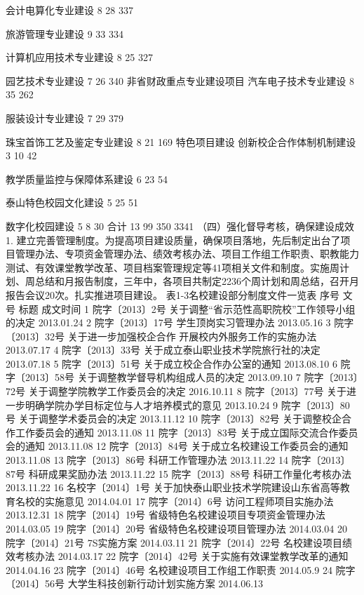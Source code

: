 会计电算化专业建设
8
28
337

旅游管理专业建设
9
33
334

计算机应用技术专业建设
8
25
327

园艺技术专业建设
7
26
340
非省财政重点专业建设项目
汽车电子技术专业建设
8
35
262

服装设计专业建设
7
29
379

珠宝首饰工艺及鉴定专业建设
8
21
169
特色项目建设
创新校企合作体制机制建设
3
10
42

教学质量监控与保障体系建设
6
23
54

泰山特色校园文化建设
5
25
51

数字化校园建设
5
8
30
合计
13
99
350
3341
（四）强化督导考核，确保建设成效
1. 建立完善管理制度。为提高项目建设质量，确保项目落地，先后制定出台了项目管理办法、专项资金管理办法、绩效考核办法、项目工作组工作职责、职教能力测试、有效课堂教学改革、项目档案管理规定等41项相关文件和制度。实施周计划、周总结和月报告制度，三年中，各项目共制定2236个周计划和周总结，召开月报告会议20次。扎实推进项目建设。
表1-3名校建设部分制度文件一览表
序号
文号
标题
成文时间
1
院字〔2013〕2号
关于调整“省示范性高职院校”工作领导小组的决定
2013.01.24
2
院字〔2013〕17号
学生顶岗实习管理办法
2013.05.16
3
院字〔2013〕32号
关于进一步加强校企合作 开展校内外服务工作的实施办法
2013.07.17
4
院字〔2013〕33号
关于成立泰山职业技术学院旅行社的决定
2013.07.18
5
院字〔2013〕51号
关于成立校企合作办公室的通知
2013.08.10
6
院字〔2013〕58号
关于调整教学督导机构组成人员的决定
2013.09.10
7
院字〔2013〕72号
关于调整学院教学工作委员会的决定
2016.10.11
8
院字〔2013〕77号
关于进一步明确学院办学目标定位与人才培养模式的意见
2013.10.24
9
院字〔2013〕80号
关于调整学术委员会的决定
2013.11.12
10
院字〔2013〕82号
关于调整校企合作工作委员会的通知
2013.11.08
11
院字〔2013〕83号
关于成立国际交流合作委员会的通知
2013.11.08
12
院字〔2013〕84号
关于成立名校建设工作委员会的通知
2013.11.08
13
院字〔2013〕86号
科研工作管理办法
2013.11.22
14
院字〔2013〕87号
科研成果奖励办法
2013.11.22
15
院字〔2013〕88号
科研工作量化考核办法
2013.11.22
16
名校字〔2014〕1号
关于加快泰山职业技术学院建设山东省高等教育名校的实施意见
2014.04.01
17
院字〔2014〕6号
访问工程师项目实施办法
2013.12.31
18
院字〔2014〕19号
省级特色名校建设项目专项资金管理办法
2014.03.05
19
院字〔2014〕20号
省级特色名校建设项目管理办法
2014.03.04
20
院字〔2014〕21号
7S实施方案
2014.03.11
21
院字〔2014〕22号
名校建设项目绩效考核办法
2014.03.17
22
院字〔2014〕42号
关于实施有效课堂教学改革的通知
2014.04.16
23
院字〔2014〕46号
名校建设项目工作组工作职责
2014.05.9
24
院字〔2014〕56号
大学生科技创新行动计划实施方案
2014.06.13
